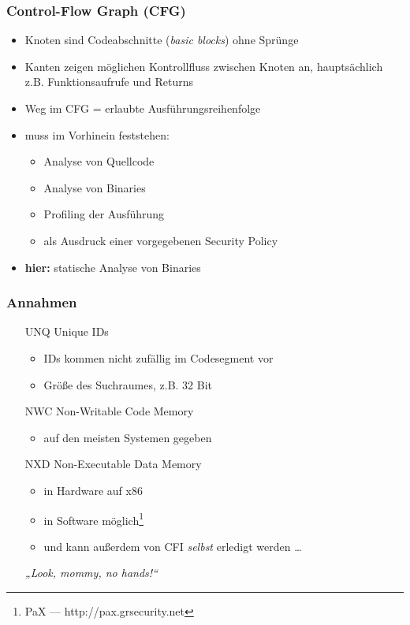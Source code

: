 \documentclass[serif,slidestop,compress,red]{beamer}
\begin{document}
\begin{frame}
  \frametitle{Control-Flow Graph (CFG)}
  \begin{itemize}
    \item Knoten sind Codeabschnitte (\emph{basic blocks}) ohne Sprünge
    \item Kanten zeigen möglichen Kontrollfluss zwischen Knoten an, hauptsächlich z.B. Funktionsaufrufe und Returns
    \item Weg im CFG = erlaubte Ausführungsreihenfolge
    \item muss im Vorhinein feststehen:
    \begin{itemize}
      \item Analyse von Quellcode
      \item Analyse von Binaries
      \item Profiling der Ausführung
      \item als Ausdruck einer vorgegebenen Security Policy
    \end{itemize}
    \item \textbf{hier:} statische Analyse von Binaries
  \end{itemize}
\end{frame}

\begin{frame}
  \frametitle{Annahmen}
  \begin{itemize}
    \item[UNQ] Unique IDs
    \begin{itemize}
      \item IDs kommen nicht zufällig im Codesegment vor
      \item Größe des Suchraumes, z.B. 32 Bit
    \end{itemize}
    \item[NWC] Non-Writable Code Memory
    \begin{itemize}
      \item auf den meisten Systemen gegeben
    \end{itemize}
    \item[NXD] Non-Executable Data Memory
    \begin{itemize}
      \item in Hardware auf x86
      \item in Software möglich\footnote{PaX — http://pax.grsecurity.net}
      \item und kann außerdem von CFI \emph{selbst} erledigt werden …
    \end{itemize}
    \begin{flushright}
      \emph{„Look, mommy, no hands!“}
    \end{flushright}
  \end{itemize}
\end{frame}
\end{document}
